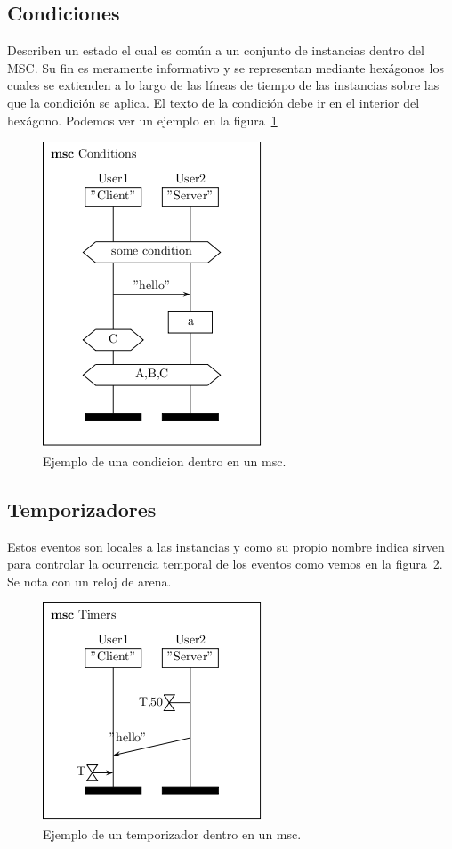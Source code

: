 \subsection*{Condiciones}
Describen un estado el cual es común a un conjunto de instancias
dentro del MSC. Su fin es meramente informativo y se representan
mediante hexágonos los cuales se extienden a lo largo de las líneas de
tiempo de las instancias sobre las que la condición se aplica. El
texto de la condición debe ir en el interior del hexágono. Podemos ver
un ejemplo en la figura~\ref{fig:condition}

\begin{figure}
  \centering
  \includegraphics[scale=1]{./images/condition.png}
  \caption{Ejemplo de una condicion dentro en un msc.}
  \label{fig:condition}
\end{figure}

\subsection*{Temporizadores}
Estos eventos son locales a las instancias y como su propio nombre
indica sirven para controlar la ocurrencia temporal de los eventos
como vemos en la figura~\ref{fig:timer}. Se
nota con un reloj de arena.

\begin{figure}
  \centering
  \includegraphics[scale=1]{./images/timer.png}
  \caption{Ejemplo de un temporizador dentro en un msc.}
  \label{fig:timer}
\end{figure}

